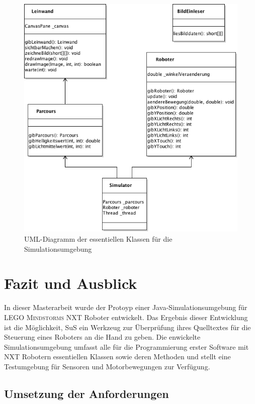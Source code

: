 \documentclass[paper=a4, DIV=calc, BCOR=12mm, twoside=on, onecolumn=on, open = right, titlepage =on, parskip =half-, headsepline = on, footsepline = off, chapterprefix = off, appendixprefix = on, fontsize = 12pt, numbers = noenddot, abstract = on]{scrbook}
\begin{document}
\begin{figure}[htb]
\centering
\hspace*{-2.5cm}\includegraphics[scale=0.75]{images/uml_simulator_essenz.png}
\caption[UML-Diagramm der Klassen des Simulators]{UML-Diagramm der essentiellen Klassen für die Simulationsumgebung}
\label{fig:simulator_uml}
\end{figure}


\newpage
\chapter{Fazit und Ausblick}

\onehalfspacing

In dieser Masterarbeit wurde der Protoyp einer Java-Simulations\-um\-ge\-bung für \textsc{LEGO Mindstorms} NXT Roboter entwickelt. Das Ergebnis dieser Entwicklung ist die Möglichkeit, SuS ein Werkzeug zur Überprüfung ihres Quelltextes für die Steuerung eines Roboters an die Hand
zu geben. Die enwickelte Simulationsumgebung umfasst alle für die
Programmierung erster Software mit NXT Robotern essentiellen Klassen sowie deren Methoden und stellt eine Testumgebung für Sensoren und Motorbewegungen zur Verfügung.


\section{Umsetzung der Anforderungen}
\end{document}

